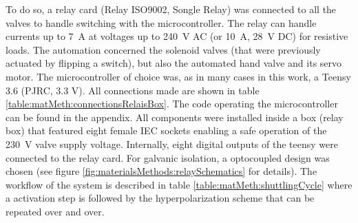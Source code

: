             To do so, a relay card (Relay ISO9002, Songle Relay) was connected to all the valves to handle switching with the microcontroller. The relay can handle currents up to \SI{7}{\ampere} at voltages up to \SI{240}{\volt} AC (or \SI{10}{\ampere}, \SI{28}{\volt} DC) for resistive loads. The automation concerned the solenoid valves (that were previously actuated by flipping a switch), but also the automated hand valve and its servo motor. The microcontroller of choice was, as in many cases in this work, a Teensy 3.6 (PJRC, 3.3 V). All connections made are shown in table \ref{table:matMeth:connectionsRelaisBox}. The code operating the microcontroller can be found in the appendix. All components were installed inside a box (relay box) that featured eight female IEC sockets enabling a safe operation of the \SI{230}{\volt} valve supply voltage.  Internally, eight digital outputs of the teensy were connected to the relay card.  For galvanic isolation, a optocoupled design was chosen (see figure \ref{fig:materialsMethods:relaySchematics} for details). The workflow of the system is described in table \ref{table:matMeth:shuttlingCycle} where a activation step is followed by the hyperpolarization scheme that can be repeated over and over.
